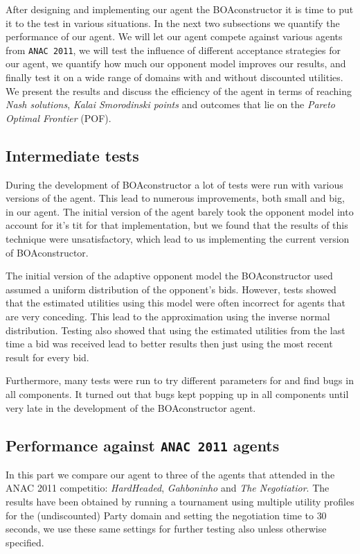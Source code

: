 After designing and implementing our agent the BOAconstructor it is time to put it to the test in various situations. In the next two subsections we quantify the performance of our agent. 
We will let our agent compete against various agents from \texttt{ANAC 2011}, we will test the influence of different acceptance strategies for our agent,
we quantify how much our opponent model improves our results, and finally test it on a wide range of domains with and without discounted utilities.
We present the results and discuss the efficiency of the agent in terms of reaching \emph{Nash solutions}, \emph{Kalai Smorodinski points} and outcomes that lie on the \emph{Pareto Optimal Frontier} (POF).

\subsection{Intermediate tests}
During the development of BOAconstructor a lot of tests were run with various versions of the agent. This lead to numerous improvements, both small and big, in our agent. The initial version of the agent barely took the opponent model into account for it's tit for that implementation, but we found that the results of this technique were unsatisfactory, which lead to us implementing the current version of BOAconstructor. 

The initial version of the adaptive opponent model the BOAconstructor used assumed a uniform distribution of the opponent's bids. However, tests showed that the estimated utilities using this model were often incorrect for agents that are very conceding. This lead to the approximation using the inverse normal distribution. Testing also showed that using the estimated utilities from the last time a bid was received lead to better results then just using the most recent result for every bid.

Furthermore, many tests were run to try different parameters for and find bugs in all components. It turned out that bugs kept popping up in all components until very late in the development of the BOAconstructor agent.


\subsection{Performance against \texttt{ANAC 2011} agents}

In this part we compare our agent to three of the agents that attended in the ANAC 2011 competitio: \emph{HardHeaded}, \emph{Gahboninho} and \emph{The Negotiatior}. The results have been obtained by running a tournament using multiple utility profiles for the (undiscounted) Party domain and setting the negotiation time to $30$ seconds,
we use these same settings for further testing also unless otherwise specified. 

